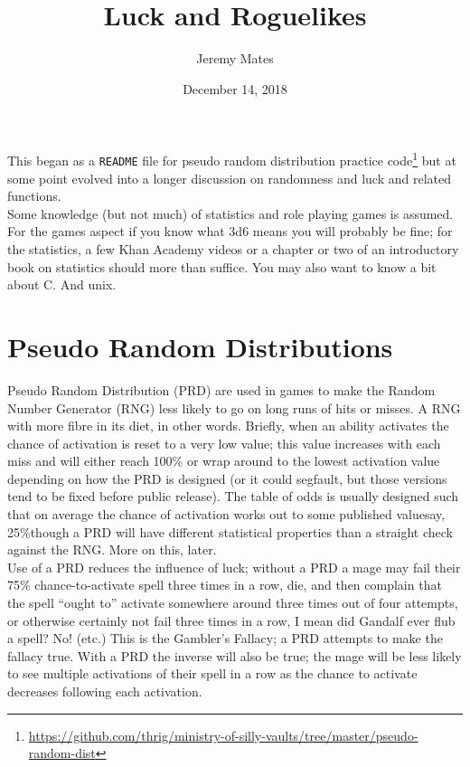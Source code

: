 \documentclass[12pt,a4paper]{article}
\title{Luck and Roguelikes}
\author{Jeremy Mates}
\date{December 14, 2018}
\begin{document}
\maketitle

\setlength{\parindent}{0pt}

This began as a \texttt{README} file for pseudo random distribution
practice
code\footnote{\url{https://github.com/thrig/ministry-of-silly-vaults/tree/master/pseudo-random-dist}}
but at some point evolved into a longer discussion on randomness and
luck and related functions. \\

Some knowledge (but not much) of statistics and role playing games is
assumed. For the games aspect if you know what 3d6 means you will
probably be fine; for the statistics, a few Khan Academy videos or a
chapter or two of an introductory book on statistics should more than
suffice. You may also want to know a bit about C. And unix.

\section*{Pseudo Random Distributions}

Pseudo Random Distribution (PRD) are used in games to make the Random
Number Generator (RNG) less likely to go on long runs of hits or misses.
A RNG with more fibre in its diet, in other words. Briefly, when an
ability activates the chance of activation is reset to a very low value;
this value increases with each miss and will either reach 100\% or wrap
around to the lowest activation value depending on how the PRD is
designed (or it could segfault, but those versions tend to be fixed
before public release). The table of odds is usually designed such that
on average the chance of activation works out to some published
value\textendash say, 25\%\textendash though a PRD will have different
statistical properties than a straight check against the RNG. More on
this, later. \\

Use of a PRD reduces the influence of luck; without a PRD a mage may
fail their 75\% chance-to-activate spell three times in a row, die, and
then complain that the spell ``ought to'' activate somewhere around
three times out of four attempts, or otherwise certainly not fail three
times in a row, I mean did Gandalf ever flub a spell? No!
(etc.) This is the Gambler's Fallacy; a PRD attempts to make
the fallacy true. With a PRD the inverse will also be true; the mage
will be less likely to see multiple activations of their spell in a row
as the chance to activate decreases following each activation. \\
\end{document}
